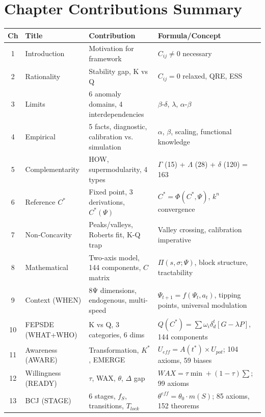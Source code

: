 \section{Chapter Contributions Summary}
\label{sec:mp-chapters}

\begin{center}
\renewcommand{\arraystretch}{1.2}
\small
\begin{longtable}{clll}
\toprule
\textbf{Ch} & \textbf{Title} & \textbf{Contribution} & \textbf{Formula/Concept} \\
\midrule
\endhead
1 & Introduction & Motivation for framework & $C_{ij} \neq 0$ necessary \\
2 & Rationality & Stability gap, K vs Q & $C_{ij} = 0$ relaxed, QRE, ESS \\
3 & Limits & 6 anomaly domains, 4 interdependencies & $\beta$-$\delta$, $\lambda$, $\alpha$-$\beta$ \\
4 & Empirical & 5 facts, diagnostic, calibration vs. simulation & $\alpha$, $\beta$, scaling, functional knowledge \\
5 & Complementarity & HOW, supermodularity, 4 types & $\Gamma$ (15) + $\Lambda$ (28) + $\delta$ (120) = 163 \\
6 & Reference $C^*$ & Fixed point, 3 derivations, $C^*(\Psi)$ & $C^* = \Phi(C^*, \Psi)$, $k^n$ convergence \\
7 & Non-Concavity & Peaks/valleys, Roberts fit, K-Q trap & Valley crossing, calibration imperative \\
8 & Mathematical & Two-axis model, 144 components, $C$ matrix & $\Pi(s,\sigma;\Psi)$, block structure, tractability \\
\midrule
9 & Context (WHEN) & 8Ψ dimensions, endogenous, multi-speed & $\Psi_{t+1} = f(\Psi_t, a_t)$, tipping points, universal modulation \\
10 & FEPSDE (WHAT+WHO) & K vs Q, 3 categories, 6 dims & $Q(C^*) = \sum \omega_i \delta_d^t [G - \lambda P]$, 144 components \\
11 & Awareness (AWARE) & Transformation, $K^*$, EMERGE & $U_{eff} = A(t^*) \times U_{pot}$; 104 axioms, 59 biases \\
12 & Willingness (READY) & $\tau$, WAX, $\theta$, $\Delta$ gap & $WAX = \tau \min + (1-\tau) \sum$; 99 axioms \\
13 & BCJ (STAGE) & 6 stages, $f_S$, transitions, $T_{lock}$ & $\theta^{eff} = \theta_0 \cdot m(S)$; 85 axioms, 152 theorems \\

\end{longtable}
\end{center}

